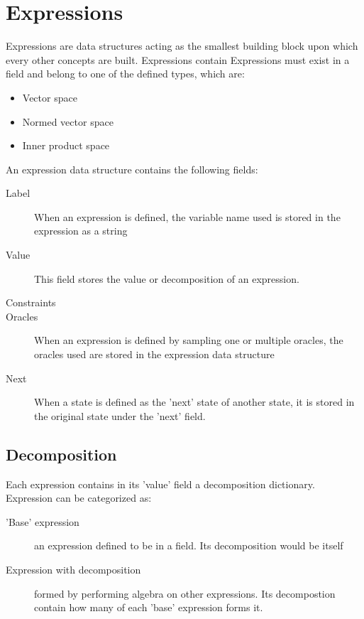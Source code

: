\section{Expressions}

Expressions are data structures acting as the smallest building block upon which every other concepts are built. Expressions contain Expressions must exist in a field and belong to one of the defined types, which are: 
\begin{itemize}
	\item Vector space
	\item Normed vector space
	\item Inner product space
\end{itemize}

An expression data structure contains the following fields:
\begin{description}
	\item[Label] When an expression is defined, the variable name used is stored in the expression as a string
	\item[Value] This field stores the value or decomposition of an expression.
	\item[Constraints] 
	\item[Oracles] When an expression is defined by sampling one or multiple oracles, the oracles used are stored in the expression data structure
	\item[Next] When a state is defined as the 'next' state of another state, it is stored in the original state under the 'next' field.
 \end{description}

\subsection*{Decomposition}
Each expression contains in its 'value' field a decomposition dictionary. Expression can be categorized as:
\begin{description}
	\item['Base' expression] an expression defined to be in a field. Its decomposition would be itself
	\item[Expression with decomposition] formed by performing algebra on other expressions. Its decompostion contain how many of each 'base' expression forms it.
\end{description}


